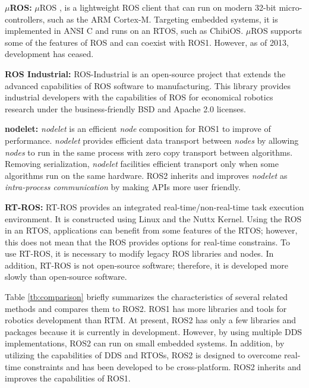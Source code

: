 \documentclass{sig-alternate-05-2015}
\begin{document}
\textbf{\(\mu\)ROS:} 
\(\mu\)ROS \cite{uros@roscon2013}, \cite{uros} is a lightweight ROS client that can run on modern 32-bit micro-controllers, such as the ARM Cortex-M. 
Targeting embedded systems, it is implemented in ANSI C and runs on an RTOS, such as ChibiOS. 
\(\mu\)ROS supports some of the features of ROS and can coexist with ROS1. 
However, as of 2013, development has ceased.

\textbf{ROS Industrial:} 
ROS-Industrial \cite{rosindustrial} is an open-source project that extends the advanced capabilities of ROS software to manufacturing. 
This library provides industrial developers with the capabilities of ROS for economical robotics research under the business-friendly BSD and Apache 2.0 licenses. 

\textbf{nodelet:} 
\emph{nodelet} is an efficient \emph{node} composition for ROS1 to improve of performance. 
\emph{nodelet} provides efficient data transport between \emph{nodes} by allowing \emph{nodes} to run in the same process with zero copy transport between algorithms. 
Removing serialization, \emph{nodelet} facilities efficient transport only when some algorithms run on the same hardware. 
ROS2 inherits and improves \emph{nodelet} as \emph{intra-process communication} by making APIs more user friendly. 

\textbf{RT-ROS:} 
RT-ROS \cite{wei2015rt} provides an integrated real-time/non-real-time task execution environment. 
It is constructed using Linux and the Nuttx Kernel. 
Using the ROS in an RTOS, applications can benefit from some features of the RTOS; however, this does not mean that the ROS provides options for real-time constrains. 
To use RT-ROS, it is necessary to modify legacy ROS libraries and nodes. 
In addition, RT-ROS is not open-source software; therefore, it is developed more slowly than open-source software.

Table \ref{tb:comparison} briefly summarizes the characteristics of several related methods and compares them to ROS2. 
ROS1 has more libraries and tools for robotics development than RTM.
At present, ROS2 has only a few libraries and packages because it is currently in development. 
However, by using multiple DDS implementations, ROS2 can run on small embedded systems. 
In addition, by utilizing the capabilities of DDS and RTOSs, ROS2 is designed to overcome real-time constraints and has been developed to be cross-platform.
ROS2 inherits and improves the capabilities of ROS1.
\end{document}
